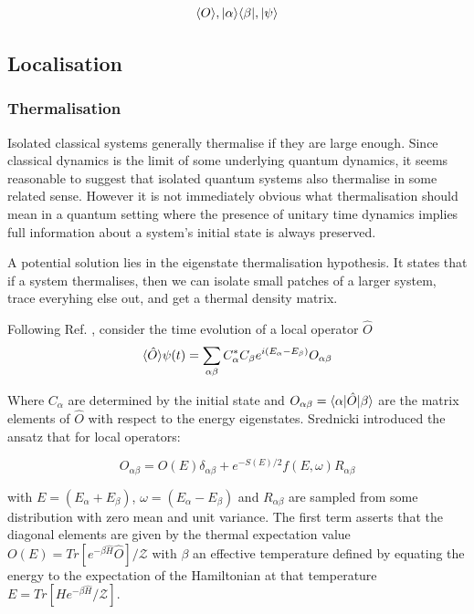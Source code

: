 \[
\langle O \rangle, |\alpha\rangle \langle\beta|, |\psi\rangle
\]

\hypertarget{localisation-1}{%
\subsection{Localisation}\label{localisation-1}}

\hypertarget{thermalisation}{%
\subsubsection{Thermalisation}\label{thermalisation}}

Isolated classical systems generally thermalise if they are large enough. Since classical dynamics is the limit of some underlying quantum dynamics, it seems reasonable to suggest that isolated quantum systems also thermalise in some related sense. However it is not immediately obvious what thermalisation should mean in a quantum setting where the presence of unitary time dynamics implies full information about a system's initial state is always preserved.

A potential solution lies in the eigenstate thermalisation hypothesis. It states that if a system thermalises, then we can isolate small patches of a larger system, trace everyhing else out, and get a thermal density matrix.

Following Ref. \autocite{abaninRecentProgressManybody2017}, consider the time evolution of a local operator \(\hat{O}\) \[ \langle \hat{O} \rangle{\psi(t)} = \sum_{\alpha \beta} C^*_\alpha C_\beta e^{i(E_\alpha - E_\beta)} O_{\alpha \beta}\]

Where \(C_\alpha\) are determined by the initial state and \(O_{\alpha \beta} = \langle \alpha | \hat{O} | \beta \rangle\) are the matrix elements of \(\hat{O}\) with respect to the energy eigenstates. Srednicki \autocite{srednickiChaosQuantumThermalization1994} introduced the ansatz that for local operators:

\[O_{\alpha \beta} = O(E)\delta_{\alpha\beta} + e^{-S(E)/2} f(E,\omega) R_{\alpha\beta}\]

with \(E = (E_\alpha + E_\beta)\), \(\omega = (E_\alpha - E_\beta)\) and \(R_{\alpha\beta}\) are sampled from some distribution with zero mean and unit variance. The first term asserts that the diagonal elements are given by the thermal expectation value \(O(E) = Tr[e^{-\beta \hat{H}} \hat{O}]/\mathcal{Z}\) with \(\beta\) an effective temperature defined by equating the energy to the expectation of the Hamiltonian at that temperature \(E = Tr[H e^{-\beta \hat{H}}/\mathcal{Z}]\).

